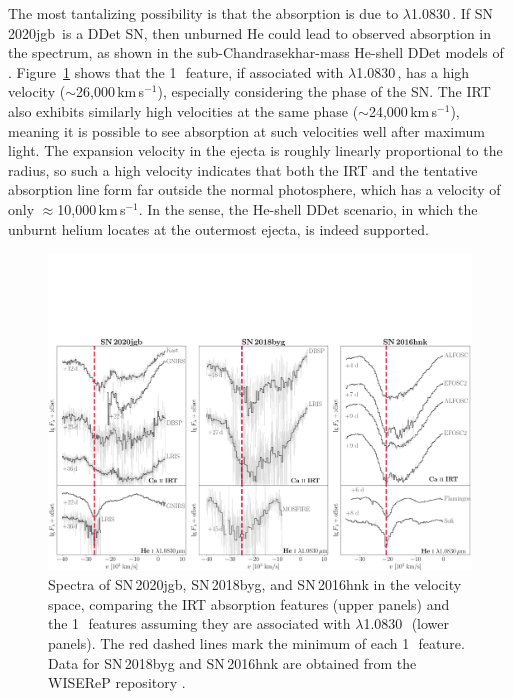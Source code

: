 \documentclass[twocolumn]{aastex631}
\newcommand{\sn}{SN\,2020jgb}
\begin{document}
The most tantalizing possibility is that the absorption is due to  $\lambda$1.0830\,\micron. If \sn\ is a DDet SN, then unburned He could lead to observed absorption in the spectrum, as shown in the sub-Chandrasekhar-mass He-shell DDet models of \citep{Boyle2017_Helium}. Figure~\ref{fig:hvf_comp} shows that the 1\,\micron\ feature, if associated with  $\lambda$1.0830\,\micron, has a high velocity ($\sim$26,000\,km\,s$^{-1}$), especially considering the phase of the SN. The  IRT also exhibits similarly high velocities at the same phase ($\sim$24,000\,km\,s$^{-1}$), meaning it is possible to see absorption at such velocities well after maximum light. The expansion velocity in the ejecta is roughly linearly proportional to the radius, so such a high velocity indicates that both the  IRT and the tentative  absorption line form far outside the normal photosphere, which has a velocity of only $\approx$10,000\,km\,s$^{-1}$. In the sense, the He-shell DDet scenario, in which the unburnt helium locates at the outermost ejecta, is indeed supported.
\begin{figure}
    \centering
    \includegraphics[width=\textwidth]{CaII_HeI_hvf.pdf}
    \caption{Spectra of \sn, SN\,2018byg, and SN\,2016hnk in the velocity space, comparing the  IRT absorption features (upper panels) and the 1\,\micron\ features assuming they are associated with  $\lambda$1.0830\,\micron\ (lower panels). The red dashed lines mark the minimum of each 1\,\micron\ feature. Data for SN\,2018byg and SN\,2016hnk are obtained from the WISEReP repository \citep{wiserep_2012}.}
    \label{fig:hvf_comp}
\end{figure}
\end{document}
